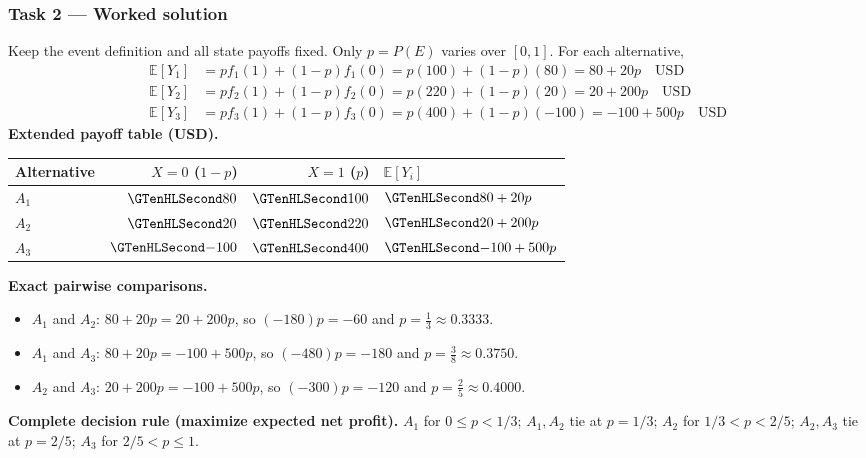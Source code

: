 \clearpage\subsubsection*{Task 2 --- Worked solution}\label{sol:c3-restaurant-decision}
Keep the event definition and all state payoffs fixed. Only $p=P(E)$ varies over $[0,1]$. For each alternative,
\begin{align*}
\mathbb E[Y_1]&=p f_1(1)+(1-p)f_1(0)=p(100)+(1-p)(80)=80+20p\quad\text{USD}\\
\mathbb E[Y_2]&=p f_2(1)+(1-p)f_2(0)=p(220)+(1-p)(20)=20+200p\quad\text{USD}\\
\mathbb E[Y_3]&=p f_3(1)+(1-p)f_3(0)=p(400)+(1-p)(-100)=-100+500p\quad\text{USD}
\end{align*}
\textbf{Extended payoff table (USD).}\begin{center}\begin{tabular}{lrrl}\toprule Alternative & $X=0$ ($1-p$) & $X=1$ ($p$) & $\mathbb E[Y_i]$\\\midrule
$A_1$ & $\Money{80}$ & $\Money{100}$ & $\Money{80+20p}$\\
$A_2$ & $\Money{20}$ & $\Money{220}$ & $\Money{20+200p}$\\
$A_3$ & $\Money{-100}$ & $\Money{400}$ & $\Money{-100+500p}$\\
\bottomrule\end{tabular}\end{center}
\textbf{Exact pairwise comparisons.}\begin{itemize}
\item $A_1$ and $A_2$: $80+20p=20+200p$, so $(-180)p=-60$ and $p=\frac{1}{3}\approx 0.3333$.
\item $A_1$ and $A_3$: $80+20p=-100+500p$, so $(-480)p=-180$ and $p=\frac{3}{8}\approx 0.3750$.
\item $A_2$ and $A_3$: $20+200p=-100+500p$, so $(-300)p=-120$ and $p=\frac{2}{5}\approx 0.4000$.
\end{itemize}
\textbf{Complete decision rule (maximize expected net profit).} $A_1$ for $0\leq p<1/3$; $A_1,A_2$ tie at $p=1/3$; $A_2$ for $1/3<p<2/5$; $A_2,A_3$ tie at $p=2/5$; $A_3$ for $2/5<p\leq1$.

